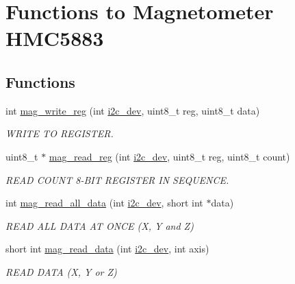\hypertarget{group__mag}{\section{Functions to Magnetometer H\-M\-C5883}
\label{group__mag}
}
\subsection*{Functions}
\begin{DoxyCompactItemize}
\item 
int \hyperlink{group__mag_gab5d0ae421cd4bb10b1b7a1eda167416b}{mag\-\_\-write\-\_\-reg} (int \hyperlink{CommunicationV0_2communication_8c_a7751bd45ac1064efb35adf1f19c25db8}{i2c\-\_\-dev}, uint8\-\_\-t reg, uint8\-\_\-t data)
\begin{DoxyCompactList}\small\item\em W\-R\-I\-T\-E T\-O R\-E\-G\-I\-S\-T\-E\-R. \end{DoxyCompactList}\item 
uint8\-\_\-t $\ast$ \hyperlink{group__mag_ga6830eaeae2298320e1e8c902e4edd709}{mag\-\_\-read\-\_\-reg} (int \hyperlink{CommunicationV0_2communication_8c_a7751bd45ac1064efb35adf1f19c25db8}{i2c\-\_\-dev}, uint8\-\_\-t reg, uint8\-\_\-t count)
\begin{DoxyCompactList}\small\item\em R\-E\-A\-D C\-O\-U\-N\-T 8-\/\-B\-I\-T R\-E\-G\-I\-S\-T\-E\-R I\-N S\-E\-Q\-U\-E\-N\-C\-E. \end{DoxyCompactList}\item 
int \hyperlink{group__mag_gab42ae0d0a2a6f37cf36d856c072b7f34}{mag\-\_\-read\-\_\-all\-\_\-data} (int \hyperlink{CommunicationV0_2communication_8c_a7751bd45ac1064efb35adf1f19c25db8}{i2c\-\_\-dev}, short int $\ast$data)
\begin{DoxyCompactList}\small\item\em R\-E\-A\-D A\-L\-L D\-A\-T\-A A\-T O\-N\-C\-E (X, Y and Z) \end{DoxyCompactList}\item 
short int \hyperlink{group__mag_ga542a31ccd07cd2c3e8e2b68cdb6d219e}{mag\-\_\-read\-\_\-data} (int \hyperlink{CommunicationV0_2communication_8c_a7751bd45ac1064efb35adf1f19c25db8}{i2c\-\_\-dev}, int axis)
\begin{DoxyCompactList}\small\item\em R\-E\-A\-D D\-A\-T\-A (X, Y or Z) \end{DoxyCompactList}\end{DoxyCompactItemize}


